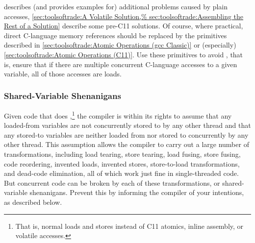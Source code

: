 \QuickQuizEnd

describes (and provides examples for) additional problems caused by
plain accesses,
\cref{sec:toolsoftrade:A Volatile Solution,%
sec:toolsoftrade:Assembling the Rest of a Solution}
describe some pre-C11 solutions.
Of course, where practical, direct C-language memory references
should be replaced by the primitives described in
\cref{sec:toolsoftrade:Atomic Operations (gcc Classic)}
or (especially)
\cref{sec:toolsoftrade:Atomic Operations (C11)}.
Use these primitives to avoid , that is, ensure that if
there are multiple concurrent C-language accesses to a given variable,
all of those accesses are loads.

\subsubsection{Shared-Variable Shenanigans}
\label{sec:toolsoftrade:Shared-Variable Shenanigans}
%
Given code that does ,\footnote{
	That is, normal loads and stores instead of C11 atomics, inline
	assembly, or volatile accesses.}
the compiler is within its rights to assume that any loaded-from variables
are not concurrently stored to by any other thread and that any stored-to
variables are neither loaded from nor stored to concurrently by any
other thread.
This assumption allows the compiler to carry out a large number of
transformations, including load tearing, store tearing,
load fusing, store fusing, code reordering, invented loads,
invented stores, store-to-load transformations, and dead-code elimination,
all of which work just fine in single-threaded code.
But concurrent code can be broken by each of these transformations,
or shared-variable shenanigans.
Prevent this by informing the compiler of your intentions, as described
below.

